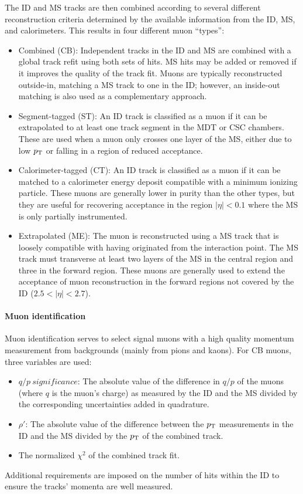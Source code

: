 The ID and MS tracks are then combined according to several different reconstruction criteria determined by the available information from the ID, MS, and calorimeters.
This results in four different muon ``types'':
\begin{itemize}
  \item Combined (CB): Independent tracks in the ID and MS are combined with a global track refit using both sets of hits.
MS hits may be added or removed if it improves the quality of the track fit.
Muons are typically reconstructed outside-in, matching a MS track to one in the ID; however, an inside-out matching is also used as a complementary approach.
  \item Segment-tagged (ST): An ID track is classified as a muon if it can be extrapolated to at least one track segment in the MDT or CSC chambers.
These are used when a muon only crosses one layer of the MS, either due to low $p_{\mathrm{T}}$ or falling in a region of reduced acceptance.
  \item Calorimeter-tagged (CT): An ID track is classified as a muon if it can be matched to a calorimeter energy deposit compatible with a minimum ionizing particle.
These muons are generally lower in purity than the other types, but they are useful for recovering acceptance in the region $|\eta| < 0.1$ where the MS is only partially instrumented.
  \item Extrapolated (ME): The muon is reconstructed using a MS track that is loosely compatible with having originated from the interaction point.
The MS track must transverse at least two layers of the MS in the central region and three in the forward region.
These muons are generally used to extend the acceptance of muon reconstruction in the forward regions not covered by the ID ($2.5 < |\eta| < 2.7$).
\end{itemize}

\paragraph*{Muon identification}
Muon identification serves to select signal muons with a high quality momentum measurement from backgrounds (mainly from pions and kaons).
For CB muons, three variables are used:
\begin{itemize}
  \item $q/p\ significance$: The absolute value of the difference in $q/p$ of the muons (where $q$ is the muon's charge) as measured by the ID and the MS divided by the corresponding uncertainties added in quadrature.
  \item $\rho'$: The absolute value of the difference between the $p_{\mathrm{T}}$ measurements in the ID and the MS divided by the $p_{\mathrm{T}}$ of the combined track.
  \item The normalized $\chi^2$ of the combined track fit.
\end{itemize}
Additional requirements are imposed on the number of hits within the ID to ensure the tracks' momenta are well measured.

